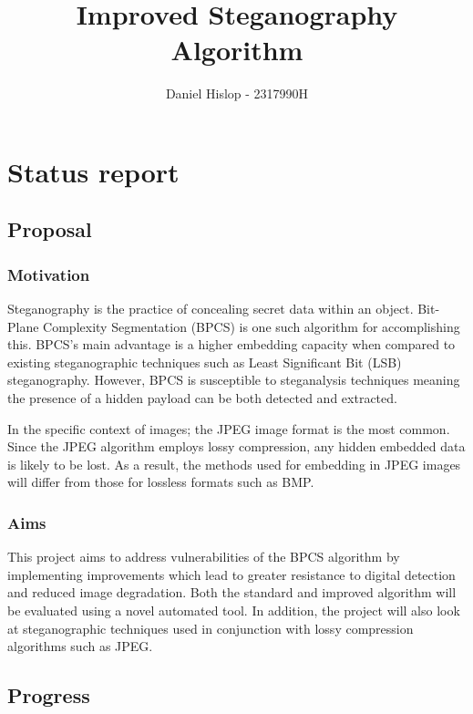 \documentclass[11pt]{article}
\title{Improved Steganography Algorithm}
\author{Daniel Hislop - 2317990H}
\begin{document}
    \maketitle
    
    
     

\section{Status report}

\subsection{Proposal}\label{proposal}

\subsubsection{Motivation}\label{motivation}

Steganography is the practice of concealing secret data within an object. Bit-Plane Complexity Segmentation (BPCS) is one such algorithm for accomplishing this. BPCS's main advantage is a higher embedding capacity when compared to existing steganographic techniques such as Least Significant Bit (LSB) steganography. However, BPCS is susceptible to steganalysis techniques meaning the presence of a hidden payload can be both detected and extracted.  

In the specific context of images; the JPEG image format is the most common. Since the JPEG algorithm employs lossy compression, any hidden embedded data is likely to be lost. As a result, the methods used for embedding in JPEG images will differ from those for lossless formats such as BMP. 


\subsubsection{Aims}\label{aims}

This project aims to address vulnerabilities of the BPCS algorithm by implementing improvements which lead to greater resistance to digital detection and reduced image degradation. Both the standard and improved algorithm will be evaluated using a novel automated tool. In addition, the project will also look at steganographic techniques used in conjunction with lossy compression algorithms such as JPEG.

\subsection{Progress}\label{progress}
\end{document}
